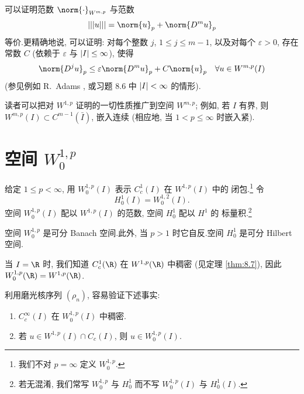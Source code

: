 可以证明范数 $\norm{\cdot}_{W^{m,p}}$ 与范数
\begin{equation*}
|||u|||=\norm{u}_p+\norm{D^mu}_p
\end{equation*}
等价.更精确地说, 可以证明: 对每个整数 $j$, $1\le j\le m-1$, 以及对每个
$\varepsilon>0$, 存在常数 $C$ (依赖于 $\varepsilon$ 与 $\left|I\right|\le\infty$),
使得
\begin{equation*}
\norm{D^ju}_p\le\varepsilon\norm{D^mu}_p+C\norm{u}_p
\quad\forall u\in W^{m,p}(I)
\end{equation*}
(参见例如 R.~Adams , 或习题 8.6 中 $\left|I\right|<\infty$ 的情形).

读者可以把对 $W^{1,p}$ 证明的一切性质推广到空间 $W^{m,p}$; 例如, 若 $I$ 有界,
则 $W^{m,p}(I)\subset C^{m-1}(\bar I)$, 嵌入连续 (相应地, 当
$1<p\le\infty$ 时嵌入紧).
\section{空间 $W_0^{1,p}$}
\label{sec:8.3}

\begin{definition}
给定 $1\le p<\infty$, 用 $W_0^{1,p}(I)$ 表示 $C_c^1(I)$ 在 $W^{1,p}(I)$ 中的
闭包.\footnote{我们不对 $p=\infty$ 定义 $W_0^{1,p}$.} 令
\begin{equation*}
H_0^1(I)=W_0^{1,2}(I).
\end{equation*}
空间 $W_0^{1,p}(I)$ 配以 $W^{1,p}(I)$ 的范数, 空间 $H_0^1$ 配以 $H^1$ 的
标量积.\footnote{若无混淆, 我们常写 $W_0^{1,p}$ 与 $H_0^1$ 而不写
$W_0^{1,p}(I)$ 与 $H_0^1(I)$.}
\end{definition}

空间 $W_0^{1,p}$ 是可分 Banach 空间.此外, 当 $p>1$ 时它自反.空间 $H_0^1$
是可分 Hilbert 空间.

\begin{remark}
\label{rem:8.13}
当 $I=\R$ 时, 我们知道 $C_c^1(\R)$ 在 $W^{1,p}(\R)$ 中稠密 (见定理
 \ref{thm:8.7}), 因此 $W_0^{1,p}(\R)=W^{1,p}(\R)$.
\end{remark}

\begin{remark}
\label{rem:8.14}
利用磨光核序列 $(\rho_n)$, 容易验证下述事实:
\begin{enumerate}[label=(\roman*), leftmargin=2.6em, itemsep=0.2em]
	\item $C_c^\infty(I)$ 在 $W_0^{1,p}(I)$ 中稠密.
	\item 若 $u\in W^{1,p}(I)\cap C_c(I)$, 则 $u\in W_0^{1,p}(I)$.
\end{enumerate}
\end{remark}

